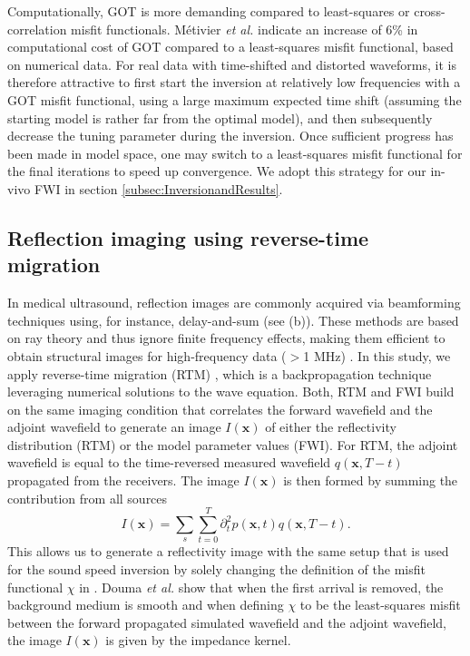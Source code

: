 \documentclass[12pt]{iopart}
\begin{document}
Computationally, GOT is more demanding compared to least-squares or cross-correlation misfit functionals. Métivier \textit{et al.} \cite{Metevier_GOT_2019} indicate an increase of 6\% in computational cost of GOT compared to a least-squares misfit functional, based on numerical data. For real data with time-shifted and distorted waveforms, it is therefore attractive to first start the inversion at relatively low frequencies with a GOT misfit functional, using a large maximum expected time shift (assuming the starting model is rather far from the optimal model), and then subsequently decrease the tuning parameter during the inversion. Once sufficient progress has been made in model space, one may switch to a least-squares misfit functional for the final iterations to speed up convergence. We adopt this strategy for our in-vivo FWI in section \ref{subsec:InversionandResults}.

\subsection{Reflection imaging using reverse-time migration}
\label{subsec:RTM}
In medical ultrasound, reflection images are commonly acquired via beamforming techniques using, for instance, delay-and-sum (see (b)). These methods are based on ray theory and thus ignore finite frequency effects, making them efficient to obtain structural images for high-frequency data ($>$1 MHz) \cite{Stotzka_resolution_2005}. In this study, we apply reverse-time migration (RTM) \cite{Levin_RTM_1984,Roy_RTM_2016}, which is a backpropagation technique leveraging numerical solutions to the wave equation. Both, RTM and FWI build on the same imaging condition that correlates the forward wavefield and the adjoint wavefield \cite{Chattopadhyay_McMechan_RTM_2008,Dai_Schuster_2013} to generate an image $I(\mathbf{x})$ of either the reflectivity distribution (RTM) or the model parameter values (FWI). For RTM, the adjoint wavefield is equal to the time-reversed measured wavefield $q(\mathbf{x},T-t)$ propagated from the receivers. The image $I(\mathbf{x})$ is then formed by summing the contribution from all sources 
\begin{equation}
    I(\mathbf{x})=\sum_s\sum_{t=0}^T\partial^2_t p(\mathbf{x},t)q(\mathbf{x},T-t).
    \label{eq:RTM_imaging_condition}
\end{equation}
This allows us to generate a reflectivity image with the same setup that is used for the sound speed inversion by solely changing the definition of the misfit functional $\chi$ in . Douma \textit{et al.} \cite{Douma_2010} show that when the first arrival is removed, the background medium is smooth and when defining $\chi$ to be the least-squares misfit between the forward propagated simulated wavefield and the adjoint wavefield, the image $I(\mathbf{x})$ is given by the impedance kernel.   
\end{document}
